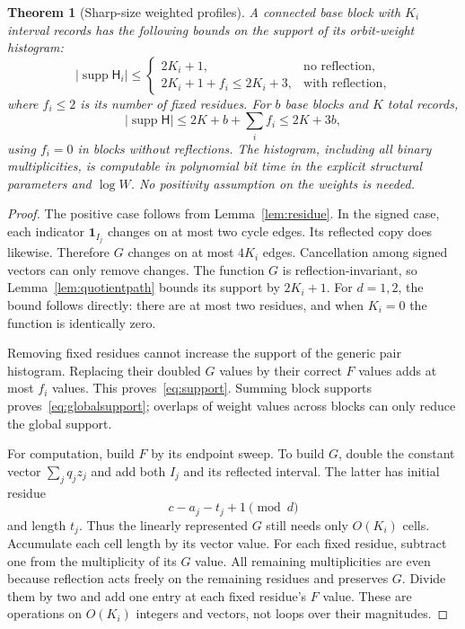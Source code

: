 \documentclass[11pt]{article}
\newtheorem{theorem}{Theorem}[section]
\theoremstyle{definition}
\newcommand{\supp}{\operatorname{supp}}
\newcommand{\hist}{\mathsf H}
\newcommand{\ind}{\mathbf 1}
\begin{document}
\begin{theorem}[Sharp-size weighted profiles]
\label{thm:profiles}
A connected base block with $K_i$ interval records has the following bounds on the support of its orbit-weight histogram:
\begin{equation}
 |\supp\hist_i|\le
 \begin{cases}
 2K_i+1,&\text{no reflection},\\
 2K_i+1+f_i\le2K_i+3,&\text{with reflection},
 \end{cases}
 \label{eq:support}
\end{equation}
where $f_i\le2$ is its number of fixed residues. For $b$ base blocks and $K$ total records,
\begin{equation}
 |\supp\hist|\le2K+b+\sum_i f_i\le2K+3b,
 \label{eq:globalsupport}
\end{equation}
using $f_i=0$ in blocks without reflections. The histogram, including all binary multiplicities, is computable in polynomial bit time in the explicit structural parameters and $\log W$. No positivity assumption on the weights is needed.
\end{theorem}
\begin{proof}
The positive case follows from Lemma~\ref{lem:residue}. In the signed case, each indicator $\ind_{I_j}$ changes on at most two cycle edges. Its reflected copy does likewise. Therefore $G$ changes on at most $4K_i$ edges. Cancellation among signed vectors can only remove changes. The function $G$ is reflection-invariant, so Lemma~\ref{lem:quotientpath} bounds its support by $2K_i+1$. For $d=1,2$, the bound follows directly: there are at most two residues, and when $K_i=0$ the function is identically zero.

Removing fixed residues cannot increase the support of the generic pair histogram. Replacing their doubled $G$ values by their correct $F$ values adds at most $f_i$ values. This proves~\eqref{eq:support}. Summing block supports proves~\eqref{eq:globalsupport}; overlaps of weight values across blocks can only reduce the global support.

For computation, build $F$ by its endpoint sweep. To build $G$, double the constant vector $\sum_jq_jz_j$ and add both $I_j$ and its reflected interval. The latter has initial residue
\begin{equation}
 c-a_j-t_j+1\pmod d
 \label{eq:reflectedinterval}
\end{equation}
and length $t_j$. Thus the linearly represented $G$ still needs only $O(K_i)$ cells. Accumulate each cell length by its vector value. For each fixed residue, subtract one from the multiplicity of its $G$ value. All remaining multiplicities are even because reflection acts freely on the remaining residues and preserves $G$. Divide them by two and add one entry at each fixed residue's $F$ value. These are operations on $O(K_i)$ integers and vectors, not loops over their magnitudes.
\end{proof}
\end{document}
